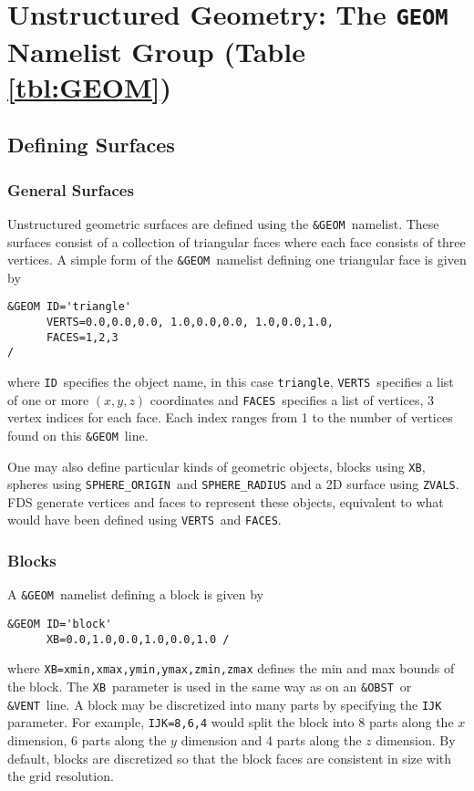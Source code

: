 \documentclass[12pt]{article}
\begin{document}
\vspace{1.0in}
\section{Unstructured Geometry: The \texorpdfstring{{\tt GEOM}}{GEOM} Namelist Group (Table \ref{tbl:GEOM})}
\label{info:GEOM}
\subsection{Defining Surfaces}

\subsubsection{General Surfaces}
Unstructured geometric surfaces are defined using the {\tt \&GEOM}\ namelist.
These surfaces consist of a collection of triangular faces where each face consists of three vertices.
A simple form of the {\tt \&GEOM}\ namelist defining one triangular face is given by

\begin{verbatim}
&GEOM ID='triangle'
      VERTS=0.0,0.0,0.0, 1.0,0.0,0.0, 1.0,0.0,1.0,
      FACES=1,2,3
/
\end{verbatim}

\noindent where {\tt ID}\ specifies the object name, in this case {\tt triangle},
{\tt VERTS}\ specifies a list of one or more $(x,y,z)$ coordinates and {\tt FACES}\ specifies a list of vertices, 3 vertex indices for each
face. Each index ranges from 1 to the number of vertices found on this {\tt \&GEOM}\ line.

One may also define particular kinds of geometric objects,  blocks using {\tt XB}, spheres using {\tt SPHERE\_ORIGIN}\ and {\tt SPHERE\_RADIUS}
and a 2D surface using {\tt ZVALS}.
FDS generate vertices and faces to represent these objects, equivalent to what would have been defined using {\tt VERTS}\ and {\tt FACES}.

\subsubsection{Blocks}
A {\tt \&GEOM}\ namelist defining a block is given by

\begin{verbatim}
&GEOM ID='block'
      XB=0.0,1.0,0.0,1.0,0.0,1.0 /
\end{verbatim}

\noindent where {\tt XB=xmin,xmax,ymin,ymax,zmin,zmax} defines the min and max bounds of the block.
The {\tt XB}\ parameter is used in the same way as on an {\tt \&OBST}\ or {\tt \&VENT}\ line.
A block may be discretized into many parts by
specifying the {\tt IJK} parameter.  For example, {\tt IJK=8,6,4} would split the block
into 8 parts along the $x$ dimension, 6 parts along the $y$ dimension and 4 parts along
the $z$ dimension. By default, blocks are discretized
so that the block faces are consistent in size with the grid resolution.
\end{document}
